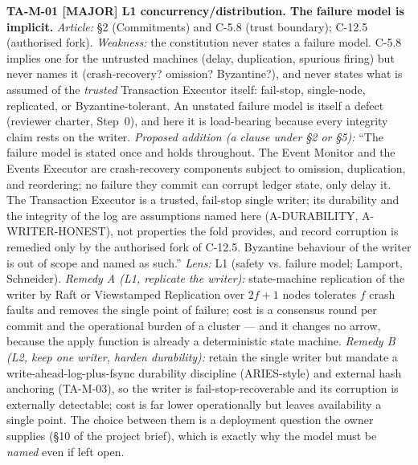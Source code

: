 \documentclass[11pt,a4paper]{article}
\newcommand{\sev}[1]{\textbf{[#1]}}
\newcommand{\lens}[1]{\textnormal{#1}}
\newcommand{\finding}[1]{\medskip\noindent\textbf{#1}}
\begin{document}
\finding{TA-M-01 \sev{MAJOR} \lens{L1 concurrency/distribution}. The failure model is
implicit.}
\emph{Article:} §2 (Commitments) and C-5.8 (trust boundary); C-12.5 (authorised fork).
\emph{Weakness:} the constitution never states a failure model. C-5.8 implies one for the
untrusted machines (delay, duplication, spurious firing) but never names it (crash-recovery?
omission? Byzantine?), and never states what is assumed of the \emph{trusted} Transaction
Executor itself: fail-stop, single-node, replicated, or Byzantine-tolerant. An unstated failure
model is itself a defect (reviewer charter, Step~0), and here it is load-bearing because every
integrity claim rests on the writer. \emph{Proposed addition (a clause under §2 or §5):}
``The failure model is stated once and holds throughout. The Event Monitor and the Events
Executor are crash-recovery components subject to omission, duplication, and reordering; no
failure they commit can corrupt ledger state, only delay it. The Transaction Executor is a
trusted, fail-stop single writer; its durability and the integrity of the log are assumptions
named here (A-DURABILITY, A-WRITER-HONEST), not properties the fold provides, and record
corruption is remedied only by the authorised fork of C-12.5. Byzantine behaviour of the writer
is out of scope and named as such.'' \emph{Lens:} L1 (safety vs. failure model; Lamport,
Schneider). \emph{Remedy A (L1, replicate the writer):} state-machine replication of the writer
by Raft or Viewstamped Replication over $2f+1$ nodes tolerates $f$ crash faults and removes the
single point of failure; cost is a consensus round per commit and the operational burden of a
cluster --- and it changes no arrow, because the apply function is already a deterministic state
machine. \emph{Remedy B (L2, keep one writer, harden durability):} retain the single writer but
mandate a write-ahead-log-plus-fsync durability discipline (ARIES-style) and external hash
anchoring (TA-M-03), so the writer is fail-stop-recoverable and its corruption is
externally detectable; cost is far lower operationally but leaves availability a single point.
The choice between them is a deployment question the owner supplies (§10 of the project brief),
which is exactly why the model must be \emph{named} even if left open.
\end{document}
